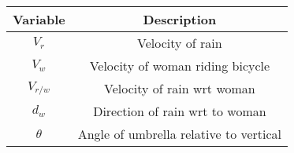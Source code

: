 \begin{tabular}[12pt]{ |c| c|}
    \hline
    \textbf{Variable} & \textbf{Description}\\ 
    \hline
    $V_r$ & Velocity of rain \\
    \hline 
    $V_w$ & Velocity of woman riding bicycle\\
    \hline
     $V_{r/w}$ & Velocity of rain wrt woman\\
     \hline
     $d_w$ & Direction of rain wrt to woman\\
    \hline
    $\theta$ & Angle of umbrella relative to vertical\\
    \hline 
    \end{tabular}
